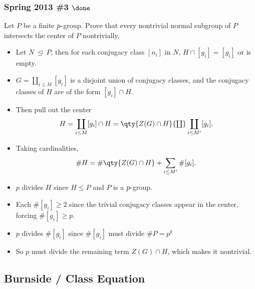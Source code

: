 \hypertarget{spring-2013-3-done}{%
\subsubsection{\texorpdfstring{Spring 2013 \#3
\(\done\)}{Spring 2013 \#3 \textbackslash done}}\label{spring-2013-3-done}}

Let \(P\) be a finite \(p{\hbox{-}}\)group. Prove that every nontrivial
normal subgroup of \(P\) intersects the center of \(P\) nontrivially.


\begin{solution}

\envlist

\begin{itemize}
\tightlist
\item
  Let \(N{~\trianglelefteq~}P\), then for each conjugacy class \([n_i]\)
  in \(N\), \(H \cap[g_i] = [g_i]\) or is empty.
\item
  \(G = {\textstyle\coprod}_{i\leq M} [g_i]\) is a disjoint union of
  conjugacy classes, and the conjugacy classes of \(H\) are of the form
  \([g_i] \cap H\).
\item
  Then pull out the center
  \begin{align*}
  H = \displaystyle\coprod_{i\leq M} [g_i] \cap H = \qty{ Z(G) \cap H } {\textstyle\coprod}\displaystyle\coprod_{i\leq M'} [g_i]
  .\end{align*}
\item
  Taking cardinalities,
  \begin{align*}
  \# H = \# \qty{ Z(G) \cap H} + \sum_{i\leq M'} \# [g_i]
  .\end{align*}
\item
  \(p\) divides \(H\) since \(H\leq P\) and \(P\) is a
  \(p{\hbox{-}}\)group.
\item
  Each \(\# [g_i] \geq 2\) since the trivial conjugacy classes appear in
  the center, forcing \(\# [g_i] \geq p\).
\item
  \(p\) divides \(\# [g_i]\) since \(\# [g_i]\) must divide
  \(\# P = p^k\)
\item
  So \(p\) must divide the remaining term \(Z(G) \cap H\), which makes
  it nontrivial.
\end{itemize}

\end{solution}

\hypertarget{burnside-class-equation}{%
\subsection{Burnside / Class Equation}\label{burnside-class-equation}}

